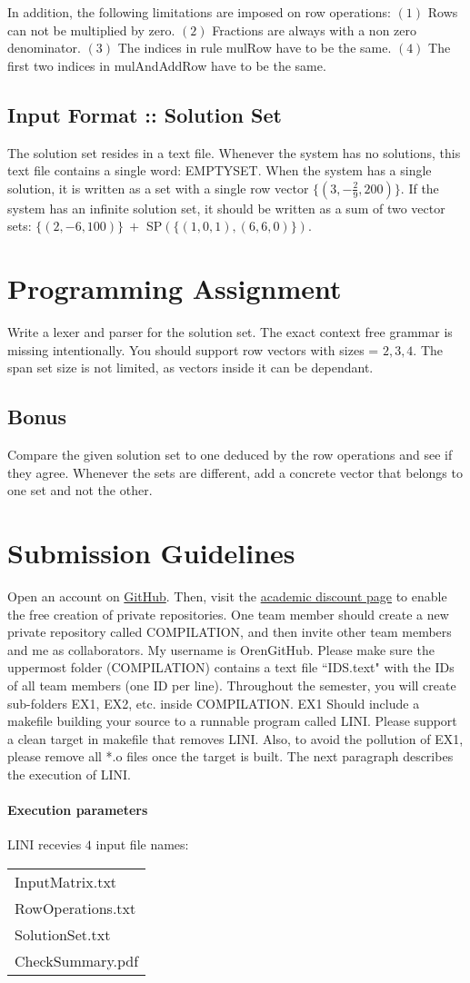 \documentclass{article}
\begin{document}
In addition, the following limitations are imposed on row operations:
$(1)$ Rows can not be multiplied by zero.
$(2)$ Fractions are always with a non zero denominator.
$(3)$ The indices in rule mulRow have to be the same.
$(4)$ The first two indices in mulAndAddRow have to be the same.

\subsection*{Input Format :: Solution Set}
The solution set resides in a text file.
Whenever the system has no solutions, this text file contains a single word:
EMPTYSET. When the system has a single solution, it is written as a set 
with a single row vector $\{(3,-\frac{2}{9},200)\}$. If the system has an infinite
solution set, it should be written as a sum of two vector sets:
$\{(2,-6,100)\} ~ +$ SP$(\{(1,0,1), (6,6,0)\})$.

\section{Programming Assignment}
Write a lexer and parser for the solution set.
The exact context free grammar is missing intentionally.
You should support row vectors with sizes = $2,3,4$.
The span set size is not limited, as vectors inside it can be dependant.

\subsection*{Bonus}
Compare the given solution set to one deduced by the row operations
and see if they agree. Whenever the sets are different,
add a concrete vector that belongs to one set and not the other.

\section{Submission Guidelines}
Open an account on \href{https://github.com/}{GitHub}.
Then, visit the
\href{https://education.github.com/discount_requests/new}{academic discount page}
to enable the free creation of private repositories.
One team member should create a new private repository called COMPILATION,
and then invite other team members and me as collaborators.
My username is OrenGitHub.
Please make sure the uppermost folder (COMPILATION) contains a text file ``IDS.text" with the IDs of all team members (one ID per line).
Throughout the semester, you will create sub-folders EX1, EX2, etc. inside COMPILATION.
EX1 Should include a makefile building your source to a runnable
program called LINI.
Please support a clean target in makefile that removes LINI.
Also, to avoid the pollution of EX1,
please remove all *.o files once the target is built.
The next paragraph describes the execution of LINI.

\paragraph{Execution parameters}
LINI recevies $4$ input file names:
\begin{table}[h]
\centering
\begin{tabular}{ l }
  InputMatrix.txt   \\
  RowOperations.txt \\
  SolutionSet.txt   \\
  CheckSummary.pdf  \\
\end{tabular}
\end{table}
\end{document}
